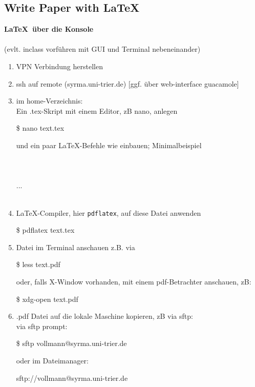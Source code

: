 \subsection{Write Paper with \LaTeX}


\textbf{\LaTeX~über die Konsole}\\
~\\
(evlt. inclass vorführen mit GUI und Terminal nebeneinander)
\begin{enumerate}
	\item VPN Verbindung herstellen
	\item ssh auf remote (syrma.uni-trier.de) [ggf. über web-interface guacamole]
	\item im home-Verzeichnis:\\
	      Ein .tex-Skript mit einem Editor, zB nano, anlegen\

	      \$ nano text.tex

	      und ein paar \LaTeX-Befehle wie  einbauen; Minimalbeispiel\\[0.1cm]
	      \hspace*{0.5cm}\\
	      \hspace*{0.5cm}\\
	      \hspace*{0.5cm}\\
	      \hspace*{0.5cm}\hspace*{0.5cm}...\\
	      \hspace*{0.5cm}\\
	\item \LaTeX-Compiler, hier \texttt{pdflatex}, auf diese Datei anwenden

	      \$ pdflatex text.tex

	\item Datei im Terminal anschauen z.B. via

	      \$ less text.pdf

	      oder, falls X-Window vorhanden, mit einem pdf-Betrachter anschauen, zB:

	      \$ xdg-open text.pdf

	\item .pdf Datei auf die lokale Maschine kopieren, zB via sftp:\\
	      via sftp prompt:

	      \$ sftp vollmann@syrma.uni-trier.de

	      oder im Dateimanager:

	      sftp://vollmann@syrma.uni-trier.de

\end{enumerate}




